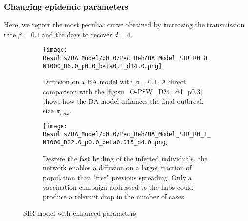 \documentclass[a4paper,10pt]{book} %
\theoremstyle{definition}
\begin{document}
\subsubsection{Changing epidemic parameters}
Here, we report the most peculiar curve obtained by increasing the transmission rate $ \beta = 0.1$ and the days to recover $ d = 4$. 
\begin{figure}[H]
	\begin{subfigure}{\linewidth}
		\centering
		\texttt{[image: Results/BA\_Model/p0.0/Pec\_Beh/BA\_Model\_SIR\_R0\_8\_N1000\_D6.0\_p0.0\_beta0.1\_d14.0.png]}
		\caption{Diffusion on a BA model with $\beta = 0.1$. A direct comparison with the \autoref{fig:sir_O-PSW_D24_d4_p0.3} shows how the BA model enhances the final outbreak size $\pi_{max}$.}
		\label{fig:sir_BA_D6_b0.1}
	\end{subfigure}
	\par\bigskip
	\begin{subfigure}{\linewidth}
		\centering
		\texttt{[image: Results/BA\_Model/p0.0/Pec\_Beh/BA\_Model\_SIR\_R0\_1\_N1000\_D22.0\_p0.0\_beta0.015\_d4.0.png]}
		\caption{Despite the fast healing of the infected individuals, the network enables a diffusion on a larger fraction of population than "free" previous spreading. Only a vaccination campaign addressed to the hubs could produce a relevant drop in the number of cases.}
		\label{fig:sir_BA_d4D22}
	\end{subfigure}
	\caption{SIR model with enhanced parameters}
\end{figure}

\clearpage
\end{document}
